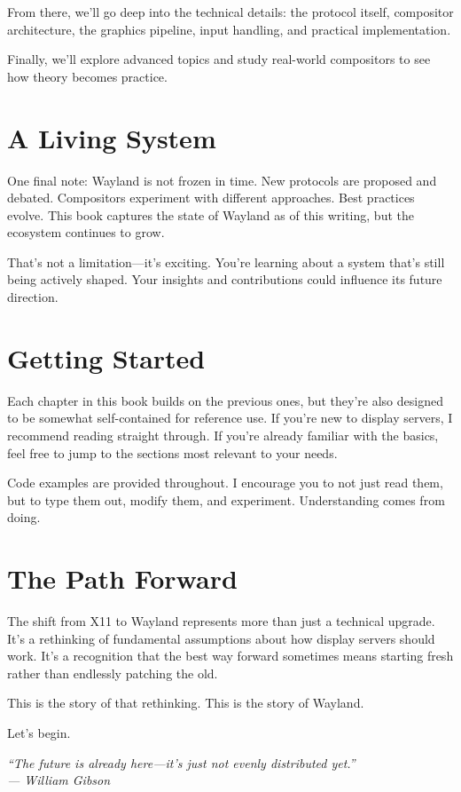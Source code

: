 From there, we'll go deep into the technical details: the protocol itself, compositor architecture, the graphics pipeline, input handling, and practical implementation.

Finally, we'll explore advanced topics and study real-world compositors to see how theory becomes practice.

\section*{A Living System}

One final note: Wayland is not frozen in time. New protocols are proposed and debated. Compositors experiment with different approaches. Best practices evolve. This book captures the state of Wayland as of this writing, but the ecosystem continues to grow.

That's not a limitation—it's exciting. You're learning about a system that's still being actively shaped. Your insights and contributions could influence its future direction.

\section*{Getting Started}

Each chapter in this book builds on the previous ones, but they're also designed to be somewhat self-contained for reference use. If you're new to display servers, I recommend reading straight through. If you're already familiar with the basics, feel free to jump to the sections most relevant to your needs.

Code examples are provided throughout. I encourage you to not just read them, but to type them out, modify them, and experiment. Understanding comes from doing.

\section*{The Path Forward}

The shift from X11 to Wayland represents more than just a technical upgrade. It's a rethinking of fundamental assumptions about how display servers should work. It's a recognition that the best way forward sometimes means starting fresh rather than endlessly patching the old.

This is the story of that rethinking. This is the story of Wayland.

Let's begin.

\vspace{2cm}

\begin{center}
\textit{``The future is already here—it's just not evenly distributed yet.''}\\
\textit{— William Gibson}
\end{center}

\clearpage
